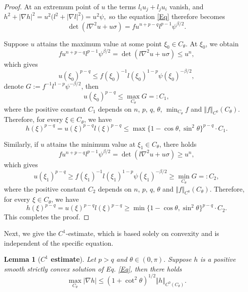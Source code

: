 \documentclass[11pt]{amsart}
\numberwithin{equation} {section}
\numberwithin{equation}{section}
\newtheorem{lemma}[theorem]{\bf Lemma}
\begin{document}
\begin{proof}
    At an extremum point of $u$ the terms $l_i u_j+l_j u_i$ vanish, and
    $
        h^2+|\nabla h|^2=u^2\bigl(l^2+|\nabla l|^2\bigr)=u^2\psi,
    $
    so the equation \eqref{Eq} therefore becomes
    \[
        \det(l\nabla^2u+u\sigma)
        =f u^{n+p-q}l^{p-1}\psi^{\beta/2}.
    \]

    Suppose $u$ attains the maximum value at some point $\xi_0\in C_{\theta}$. At $\xi_0$, we obtain
    \[
        f u^{n+p-q}l^{p-1}\psi^{\beta/2}
        =\det(l\nabla^2u+u\sigma)\leq u^n,
    \]
    which gives
    \[
        u(\xi_0)^{p-q}\leq
        f(\xi_0)^{-1}l(\xi_0)^{1-p}\psi(\xi_0)^{-\beta/2},
    \]
    denote $G:=f^{-1}l^{1-p}\psi^{-\beta/2}$, then 
    $$u(\xi_0)^{p-q} \leq \max_{C_{\theta}}G=:C_1,$$
    where the positive constant $C_1$ depends on $n$, $p$, $q$, $\theta$, $\min_{C_{\theta}}f$ and $\Vert f\Vert_{C^0}(C_{\theta})$.
    Therefore, for every $\xi\in C_{\theta}$, we have
    \[
        h(\xi)^{p-q}
        =u(\xi)^{p-q}l(\xi)^{p-q}
        \leq \max\{1-\cos\theta, \sin^2\theta\}^{p-q}\cdot C_1.
    \]

    Similarly, if $u$ attains the minimum value at $\xi_1\in C_{\theta}$, there holds
    \[
        f u^{n+p-q}l^{p-1}\psi^{\beta/2}
        =\det(l\nabla^2u+u\sigma)\geq u^n,
    \]
    which gives
    \[
        u(\xi_1)^{p-q}\geq
        f(\xi_1)^{-1}l(\xi_1)^{1-p}\psi(\xi_1)^{-\beta/2}
        \geq \min_{C_{\theta}}G=:C_2,
    \]
    where the positive constant $C_2$ depends on $n$, $p$, $q$, $\theta$ and $\Vert f\Vert_{C^0}(C_{\theta})$.
   Therefore, for every $\xi\in C_{\theta}$, we have
    \[
        h(\xi)^{p-q}
        =u(\xi)^{p-q}l(\xi)^{p-q}
        \geq \min\{1-\cos\theta, \sin^2\theta\}^{p-q}\cdot C_2.
    \]
   This completes the proof.
\end{proof}

Next, we give the $C^1$-estimate, which is based solely on convexity and is independent of the specific equation.

\begin{lemma}[{\bf $C^1$ estimate}]\label{c1-1}
    Let $p>q$ and $\theta\in (0,\pi)$. Suppose $h$ is a positive smooth strictly convex solution of Eq. \eqref{Eq}, then there holds
    \begin{equation}\label{b1}
        \max_{C_{\theta}}|\nabla h| \leq (1+\cot^2\theta)^{1/2} \Vert h\Vert_{C^{0}(C_{\theta})}.
    \end{equation}
\end{lemma}
\end{document}
